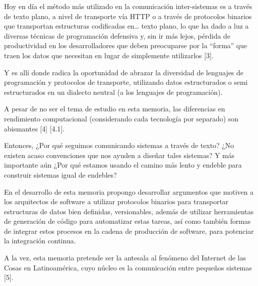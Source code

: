 Hoy en día el método más utilizado en la comunicación inter-sistemas es a través de texto plano, a nivel de transporte vía HTTP o a través de protocolos binarios que transportan estructuras codificadas en… texto plano, lo que ha dado a luz a diversas técnicas de programación defensiva y, sin ir más lejos, pérdida de productividad en los desarrolladores que deben preocuparse por la “forma” que traen los datos que necesitan en lugar de simplemente utilizarlos [3].

Y es allí donde radica la oportunidad de abrazar la diversidad de lenguajes de programación y protocolos de transporte, utilizando datos estructurados o semi estructurados en un dialecto neutral (a los lenguajes de programación).

A pesar de no ser el tema de estudio en esta memoria, las diferencias en rendimiento computacional (considerando cada tecnología por separado) son abismantes [4] [4.1].

Entonces, ¿Por qué seguimos comunicando sistemas a través de texto? ¿No existen acaso convenciones que nos ayuden a diseñar tales sistemas? Y más importante aún ¿Por qué estamos usando el camino más lento y endeble para construir sistemas igual de endebles?

En el desarrollo de esta memoria propongo desarrollar argumentos que motiven a los arquitectos de software a utilizar protocolos binarios para transportar estructuras de datos bien definidas, versionables, además de utilizar herramientas de generación de código para automatizar estas tareas, así como también formas de integrar estos procesos en la cadena de producción de software, para potenciar la integración continua.

A la vez, esta memoria pretende ser la antesala al fenómeno del Internet de las Cosas en Latinoamérica, cuyo núcleo es la comunicación entre pequeños sistemas [5].